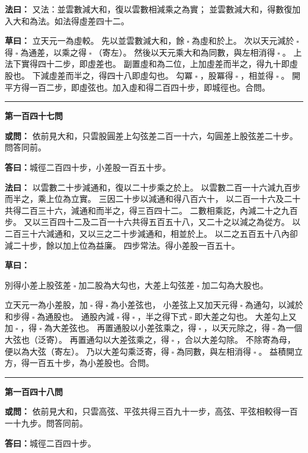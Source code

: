\documentclass[11pt,a4paper]{article}
\let\origsquare\square
\renewcommand{\square}{\ensuremath{\origsquare}}%
\newcommand{\longline}{\noindent\rule{\textwidth}{0.4pt}}
\newcommand{\owen}[1]{%
  \par\vspace{0.4em}%
  \noindent\textcolor{problemcolor}{\textbf{或問：}}{\tradfont #1}\par\nopagebreak%
}
\newcommand{\fayue}[1]{%
  \par\noindent\textcolor{methodcolor}{\textbf{法曰：}}{\tradfont #1}\par\nopagebreak%
}
\newcommand{\tsaoyue}[1]{%
  \par\noindent\textcolor{workcolor}{\textbf{草曰：}}{\tradfont #1}\par%
}
\newcommand{\dayue}[1]{%
  \par\noindent\textcolor{anscolor}{\textbf{答曰：}}{\tradfont #1}\par\nopagebreak%
}
\newcommand{\wen}[1]{\par\vspace{0.3em}\noindent\textcolor{problemcolor}{\textbf{第#1問}}\par}
\begin{document}
\fayue{%
又法：並雲數減大和，復以雲數相減乘之為實；
並雲數減大和，得數復加入大和為法。如法得虛差四十二。}

\tsaoyue{%
立天元一為虛較。
先以並雲數減大和，餘$ \; \square \; $為虛和於上。
次以天元減於$ \; \square \; $得$ \; \square \; $為通差，以乘之得$ \; \square \; $（寄左）。
然後以天元乘大和為同數，與左相消得$ \; \square \; $。
上法下實得四十二步，即虛差也。
副置虛和為二位，上加虛差而半之，得九十即虛股也。
下減虛差而半之，得四十八即虛勾也。
勾冪$ \; \square \; $，股冪得$ \; \square \; $，相並得$ \; \square \; $。
開平方得一百二步，即虛弦也。加入虛和得二百四十步，即城徑也。合問。}

\vspace{0.5cm}
\begin{center}
\longline
\end{center}

\wen{一百四十七}
\owen{%
依前見大和，只雲股圓差上勾弦差二百一十六，勾圓差上股弦差二十步。問答同前。}
\dayue{城徑二百四十步，小差股一百五十步。}

\fayue{%
以雲數二十步減通和，復以二十步乘之於上。
以雲數二百一十六減九百步而半之，乘上位為立實。
三因二十步以減通和得八百六十，
以二百一十六及二十共得二百三十六，減通和而半之，得三百四十二。
二數相乘訖，內減二十之九百步。
又以三百四十二及二百一十六共得五百五十八，又二十之以減之為從方。
以二百三十六減通和，又以三之二十步減通和，相並於上。
以二之五百五十八內卻減二十步，餘以加上位為益廉。
四步常法。得小差股一百五十。}

\tsaoyue{%
別得小差上股弦差$ \; \square \; $加二股為大勾也，大差上勾弦差$ \; \square \; $加二勾為大股也。

立天元一為小差股，加$ \; \square \; $得$ \; \square \; $為小差弦也，
小差弦上又加天元得$ \; \square \; $為通勾，以減於和步得$ \; \square \; $為通股也。
通股內減$ \; \square \; $得$ \; \square \; $，半之得下式$ \; \square \; $即大差之勾也。
大差勾上又加$ \; \square \; $，得$ \; \square \; $為大差弦也。
再置通股以小差弦乘之，得$ \; \square \; $，以天元除之，得$ \; \square \; $為一個大弦也（泛寄）。
再置通勾以大差弦乘之，得$ \; \square \; $，合以大差勾除。
不除寄為母，便以為大弦（寄左）。
乃以大差勾乘泛寄，得$ \; \square \; $為同數，與左相消得$ \; \square \; $。
益積開立方，得一百五十步，為小差股也。合問。}

\vspace{0.5cm}
\begin{center}
\longline
\end{center}

\wen{一百四十八}
\owen{%
依前見大和，只雲高弦、平弦共得三百九十一步，高弦、平弦相較得一百一十九步。問答同前。}
\dayue{城徑二百四十步。}
\end{document}
